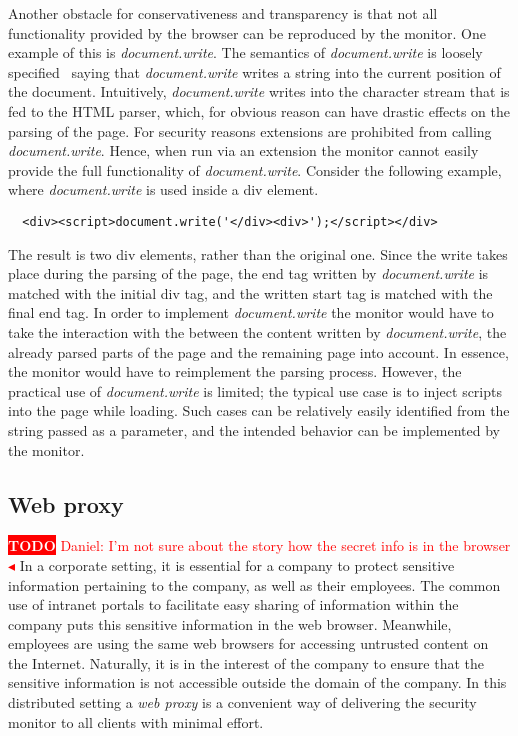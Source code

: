 \documentclass{llncs}
\newcommand{\todo}[1]{\colorbox{red}{\textcolor{white}{\sffamily\bfseries\scriptsize TODO}} \textcolor{red}{#1} \textcolor{red}{$\blacktriangleleft$}}
\begin{document}
Another obstacle for conservativeness and transparency is that not all
functionality provided by the browser can be reproduced by the monitor. One
example of this is \emph{document.write}. The semantics of
\emph{document.write} is loosely specified~\cite{DOM:LVL2} saying that \emph{document.write}
writes a string into the current position of the document.  Intuitively,
\emph{document.write} writes into the character stream that is fed to the HTML
parser, which, for obvious reason can have drastic effects on the parsing of
the page. For security reasons extensions are prohibited from calling
\emph{document.write}. Hence, when run via an extension the monitor cannot
easily provide the full functionality of \emph{document.write}.
Consider the following example, where \emph{document.write} is used inside
a div element.

\begin{verbatim}
  <div><script>document.write('</div><div>');</script></div>
\end{verbatim}

The result is two div elements, rather than the original one. Since the write
takes place during the parsing of the page, the end tag written by
\emph{document.write} is matched with the initial div tag, and the written
start tag is matched with the final end tag. In order to implement
\emph{document.write} the monitor would have to take the interaction with the
between the content written by \emph{document.write}, the already parsed parts
of the page and the remaining page into account. In essence, the monitor would
have to reimplement the parsing process.  However, the practical use of
\emph{document.write} is limited; the typical use case is to inject scripts
into the page while loading. Such cases can be relatively easily identified
from the string passed as a parameter, and the intended behavior can be
implemented by the monitor.




\subsection{Web proxy}

\todo{Daniel: I'm not sure about the story how the secret info is in the browser}
In a corporate setting, it is essential for a company to protect 
sensitive information pertaining to the company, as well as their employees. 
The common use of intranet portals to facilitate easy sharing of information 
within the company puts this sensitive information in the web browser. 
Meanwhile, employees are using the same web browsers for accessing untrusted content on 
the Internet. Naturally, it is in the interest of the company to ensure that 
the sensitive information is not accessible outside the domain of the company.
In this distributed setting a \emph{web proxy} is a convenient way of delivering 
the security monitor to all clients with minimal effort. 
\end{document}
